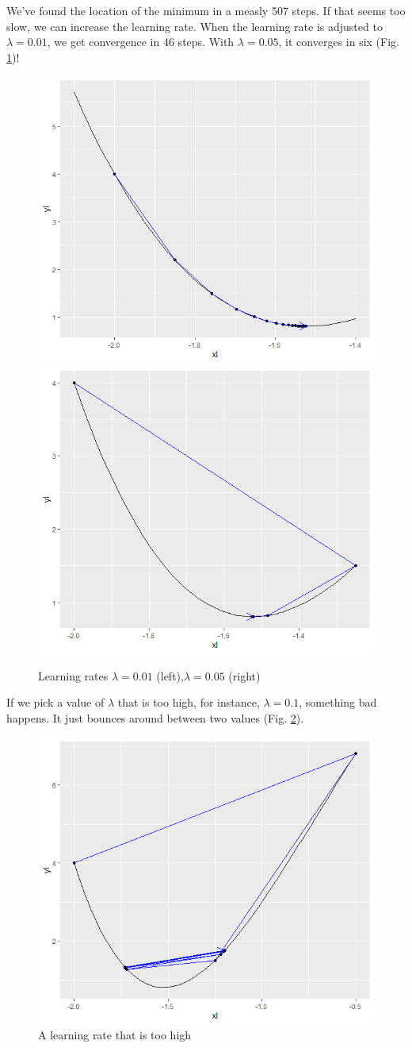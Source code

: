 \documentclass[
]{book}
\theoremstyle{definition}
\theoremstyle{definition}
\theoremstyle{definition}
\theoremstyle{definition}
\theoremstyle{remark}
\begin{document}
We've found the location of the minimum in a measly 507 steps. If that seems too slow, we can increase the learning rate. When the learning rate is adjusted to \(\lambda=0.01\), we get convergence in 46 steps. With \(\lambda=0.05\), it converges in six (Fig. \ref{fig:GD4})!

\begin{figure}

{\centering \includegraphics[width=0.4\linewidth]{images/gd3} \includegraphics[width=0.4\linewidth]{images/gd4} 

}

\caption{Learning rates $\lambda=0.01$ (left),$\lambda=0.05$ (right)}\label{fig:GD4}
\end{figure}

If we pick a value of \(\lambda\) that is too high, for instance, \(\lambda=0.1\), something bad happens. It just bounces around between two values (Fig. \ref{fig:GD5}).

\begin{figure}

{\centering \includegraphics[width=0.75\linewidth]{images/gd5} 

}

\caption{A learning rate that is too high}\label{fig:GD5}
\end{figure}
\end{document}
